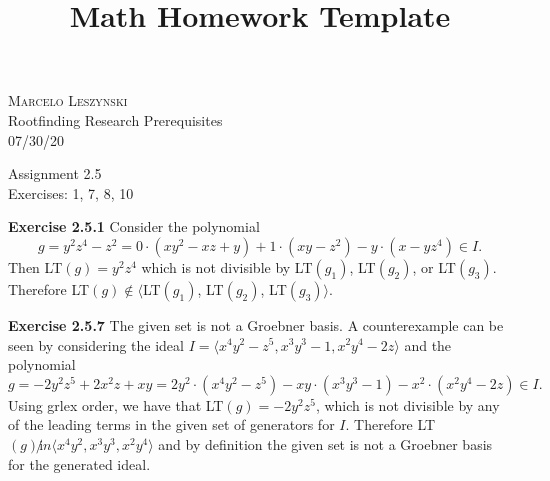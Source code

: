 \documentclass[12pt,oneside]{article}
\newenvironment{exercise}[1]{\vspace{.1in}\noindent\textbf{Exercise #1 \hspace{.05em}}}{}
\begin{document}
\title{Math Homework Template}

\begin{flushright}
\textsc{Marcelo Leszynski}  \\
Rootfinding Research Prerequisites\\
07/30/20
\end{flushright}

\begin{center}
\textsf{Assignment 2.5 } \\
\textsf{Exercises: 1, 7, 8, 10 }
\end{center}


\begin{exercise}{2.5.1}
    Consider the polynomial 
    \[
        g = y^2z^4-z^2 = 0\cdot (xy^2-xz+y) + 1 \cdot(xy-z^2) -y \cdot(x-yz^4) \in I. 
    \]
    Then LT$(g) = y^2z^4$ which is not divisible by LT$(g_1)$, 
    LT$(g_2)$, or LT$(g_3)$. Therefore LT$(g) \not \in \langle $LT$(g_1)$, LT$(g_2)$, 
    LT$(g_3)\rangle$.
\end{exercise}


\begin{exercise}{2.5.7}
    The given set is not a Groebner basis. A counterexample can be seen by considering 
    the ideal $I = \langle x^4y^2-z^5,x^3y^3-1,x^2y^4-2z \rangle$ and the polynomial
    \[
        g=-2y^2z^5+2x^2z+xy=2y^2\cdot(x^4y^2-z^5)-xy\cdot(x^3y^3-1)-x^2\cdot(x^2y^4-2z) \in I. 
    \]
    Using grlex order, we have that LT$(g) = -2y^2z^5$, which is not divisible by any 
    of the leading terms in the given set of generators for $I$. Therefore 
    LT$(g) \not in \langle x^4y^2,x^3y^3,x^2y^4\rangle$ and by definition the given set is not a Groebner basis for the generated ideal.
\end{exercise}

\end{document}
